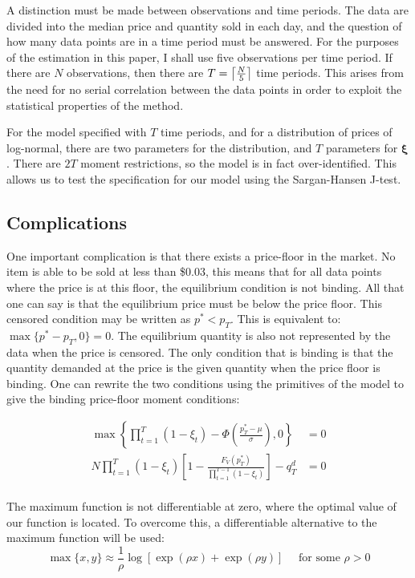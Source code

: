 \documentclass[12pt, letterpaper]{paper}
\DeclarePairedDelimiter{\ceil}{\lceil}{\rceil}
\begin{document}
A distinction must be made between observations and time
periods. The data are divided into the median price and quantity
sold in each day, and the question of how many data points are in a
time period must be answered. For the purposes of the estimation in this paper,
I shall use five observations per time period. If there are $N$
observations, then there are $T = \ceil*{ \frac{ N }{5} }$ time
periods. This arises from the need for no serial correlation between
the data points in order to exploit the statistical properties of the method.

For the model specified with $T$ time periods, and for a distribution of
prices of log-normal, there are two parameters for the distribution, and
$T$ parameters for $\bm{\xi}$. There are $2T$ moment restrictions, so the model
is in fact over-identified. This allows us to test the specification
for our model using the Sargan-Hansen J-test.

\subsection{Complications}
\label{sec-4-1}

One important complication is that there exists a price-floor in the
market. No item is able to be sold at less than \$0.03, this means
that for all data points where the price is at this floor, the
equilibrium condition is not binding. All that one can say is that the
equilibrium price must be below the price floor. This censored
condition may be written as $p^* < p_T$. This is equivalent to: $\max\{
p^* - p_T, 0 \} = 0$. The equilibrium quantity is also not represented
by the data when the price is censored. The only condition that is
binding is that the quantity demanded at the price is the given
quantity when the price floor is binding. One can rewrite the two
conditions using the primitives of the model to give the binding
price-floor moment conditions:

\begin{align*}
\max \left \{ \prod_{t=1}^T ( 1 - \xi_t ) - \Phi \left ( \frac{ p_T^* - \mu }{\sigma} \right ), 0 \right \} &= 0\\
N \prod_{t=1}^T ( 1 - \xi_t ) \left [ 1 - \frac{ F_V ( p_T^* ) }{ \prod_{t=1}^{T-1} ( 1 - \xi_t ) } \right ] - q_T^d &= 0\\
\end{align*}

The maximum function is not differentiable at zero, where the
optimal value of our function is located. To overcome this, a
differentiable alternative to the maximum function will be used: 
\begin{equation*}
\max \{ x,y \} \approx \frac{ 1 }{\rho} \log \left [ \exp ( \rho x ) + \exp ( \rho y
) \right ] \quad \text{ for some } \rho > 0
\end{equation*}
\end{document}
